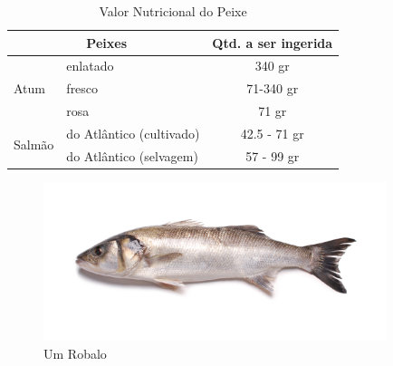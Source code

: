 \documentclass[a4paper, 11pt]{article}
\begin{document}
	\begin{table}[ht]
		\centering
		\begin{tabular}{|l|l|c|}
		\hline
		\multicolumn{2}{|c}{\textbf{Peixes}}& \textbf{Qtd. a ser ingerida} \\ \hline
		\multirow{3}{*}{Atum}               & enlatado                           & 340 gr                       \\ \cline{2-3} 
							                & fresco                             & 71-340 gr                    \\ \cline{2-3} 
							                & rosa                               & 71 gr                        \\ \hline
		\multirow{2}{*}{Salmão}             & do Atlântico (cultivado)           & 42.5 - 71 gr                 \\ \cline{2-3} 
							                & do Atlântico (selvagem)            & 57 - 99 gr                   \\ \hline
		\end{tabular}
		\caption{Valor Nutricional do Peixe}
		\label{tab:valor_nutricional_peixe}
	\end{table}

	\vskip 5cm

	\begin{figure}[h]
		\centering
		\includegraphics[width=10cm]{./Robalo.png}
		\caption{Um Robalo}
	\end{figure}

	\newpage
	\tableofcontents
	\listoffigures
	\listoftables
\end{document}

